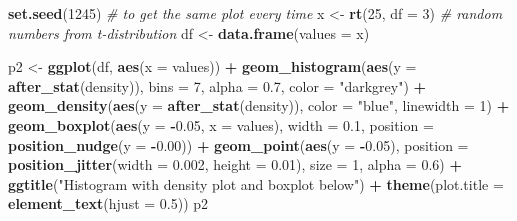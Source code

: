 \documentclass[
]{book}
\newenvironment{Shaded}{\begin{snugshade}}{\end{snugshade}}
\newcommand{\AttributeTok}[1]{\textcolor[rgb]{0.13,0.29,0.53}{#1}}
\newcommand{\CommentTok}[1]{\textcolor[rgb]{0.56,0.35,0.01}{\textit{#1}}}
\newcommand{\DecValTok}[1]{\textcolor[rgb]{0.00,0.00,0.81}{#1}}
\newcommand{\FloatTok}[1]{\textcolor[rgb]{0.00,0.00,0.81}{#1}}
\newcommand{\FunctionTok}[1]{\textcolor[rgb]{0.13,0.29,0.53}{\textbf{#1}}}
\newcommand{\NormalTok}[1]{#1}
\newcommand{\OtherTok}[1]{\textcolor[rgb]{0.56,0.35,0.01}{#1}}
\newcommand{\SpecialCharTok}[1]{\textcolor[rgb]{0.81,0.36,0.00}{\textbf{#1}}}
\newcommand{\StringTok}[1]{\textcolor[rgb]{0.31,0.60,0.02}{#1}}
\begin{document}
\begin{Shaded}
\begin{Highlighting}[]
\FunctionTok{set.seed}\NormalTok{(}\DecValTok{1245}\NormalTok{) }\CommentTok{\# to get the same plot every time}
\NormalTok{x }\OtherTok{\textless{}{-}} \FunctionTok{rt}\NormalTok{(}\DecValTok{25}\NormalTok{, }\AttributeTok{df =} \DecValTok{3}\NormalTok{) }\CommentTok{\# random numbers from t{-}distribution}
\NormalTok{df }\OtherTok{\textless{}{-}} \FunctionTok{data.frame}\NormalTok{(}\AttributeTok{values =}\NormalTok{ x)}

\NormalTok{p2 }\OtherTok{\textless{}{-}} \FunctionTok{ggplot}\NormalTok{(df, }\FunctionTok{aes}\NormalTok{(}\AttributeTok{x =}\NormalTok{ values)) }\SpecialCharTok{+}
  \FunctionTok{geom\_histogram}\NormalTok{(}\FunctionTok{aes}\NormalTok{(}\AttributeTok{y =} \FunctionTok{after\_stat}\NormalTok{(density)),}
                 \AttributeTok{bins =} \DecValTok{7}\NormalTok{, }\AttributeTok{alpha =} \FloatTok{0.7}\NormalTok{, }\AttributeTok{color =} \StringTok{"darkgrey"}\NormalTok{) }\SpecialCharTok{+}
  \FunctionTok{geom\_density}\NormalTok{(}\FunctionTok{aes}\NormalTok{(}\AttributeTok{y =} \FunctionTok{after\_stat}\NormalTok{(density)), }\AttributeTok{color =} \StringTok{"blue"}\NormalTok{, }\AttributeTok{linewidth =} \DecValTok{1}\NormalTok{) }\SpecialCharTok{+}
  \FunctionTok{geom\_boxplot}\NormalTok{(}\FunctionTok{aes}\NormalTok{(}\AttributeTok{y =} \SpecialCharTok{{-}}\FloatTok{0.05}\NormalTok{, }\AttributeTok{x =}\NormalTok{ values), }\AttributeTok{width =} \FloatTok{0.1}\NormalTok{,}
               \AttributeTok{position =} \FunctionTok{position\_nudge}\NormalTok{(}\AttributeTok{y =} \SpecialCharTok{{-}}\FloatTok{0.00}\NormalTok{)) }\SpecialCharTok{+}
  \FunctionTok{geom\_point}\NormalTok{(}\FunctionTok{aes}\NormalTok{(}\AttributeTok{y =} \SpecialCharTok{{-}}\FloatTok{0.05}\NormalTok{),}
             \AttributeTok{position =} \FunctionTok{position\_jitter}\NormalTok{(}\AttributeTok{width =} \FloatTok{0.002}\NormalTok{, }\AttributeTok{height =} \FloatTok{0.01}\NormalTok{),}
             \AttributeTok{size =} \DecValTok{1}\NormalTok{, }\AttributeTok{alpha =} \FloatTok{0.6}\NormalTok{) }\SpecialCharTok{+}
  \FunctionTok{ggtitle}\NormalTok{(}\StringTok{"Histogram with density plot and boxplot below"}\NormalTok{) }\SpecialCharTok{+}
  \FunctionTok{theme}\NormalTok{(}\AttributeTok{plot.title =} \FunctionTok{element\_text}\NormalTok{(}\AttributeTok{hjust =} \FloatTok{0.5}\NormalTok{))}
\NormalTok{p2}
\end{Highlighting}
\end{Shaded}
\end{document}
